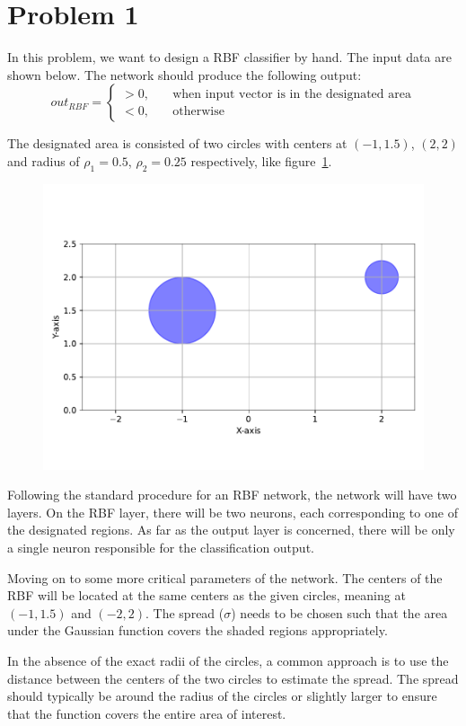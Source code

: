 \section{Problem 1}

In this problem, we want to design a RBF classifier by hand. The input data are shown below. The network should produce the following output:
\[
out_{RBF} = \left\{
\begin{array}{cc}
	> 0,& \quad \text{when input vector is in the designated area}\\
	< 0,& \quad \text{otherwise}
\end{array}
\right.
\]

The designated area is consisted of two circles with centers at $\left( -1, 1.5 \right)$, $\left( 2,2 \right)$ and radius of $\rho_1 = 0.5$, $\rho_2 = 0.25$ respectively, like figure~\ref{fig:prob1_circles}.

\begin{figure}[htpb]
	\centering
	\includegraphics[width=0.5\linewidth]{../Problem 1/prob1_designated_area.pdf}
	\caption{}
	\label{fig:prob1_circles}
\end{figure}

Following the standard procedure for an RBF network, the network will have two layers. On the RBF layer, there will be two neurons, each corresponding to one of the designated regions.
As far as the output layer is concerned, there will be only a single neuron responsible for the classification output.

Moving on to some more critical parameters of the network. The centers of the RBF will be located at the same centers as the given circles, meaning at $(-1, 1.5)$ and $(-2, 2)$.
The spread ($\sigma$) needs to be chosen such that the area under the Gaussian function covers the shaded regions appropriately. 

In the absence of the exact radii of the circles, a common approach is to use the distance between the centers of the two circles to estimate the spread. The spread should typically be around the radius of the circles or slightly larger to ensure that the function covers the entire area of interest. 

